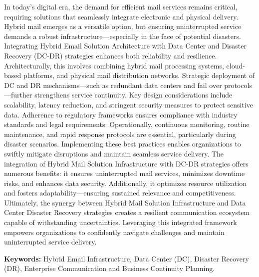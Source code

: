 In today's digital era, the demand for efficient mail services remains critical, requiring solutions that seamlessly integrate electronic and physical delivery. Hybrid mail emerges as a versatile option, but ensuring uninterrupted service demands a robust infrastructure—especially in the face of potential disasters. Integrating Hybrid Email Solution Architecture with Data Center and Disaster Recovery (DC-DR) strategies enhances both reliability and resilience. Architecturally, this involves combining hybrid mail processing systems, cloud-based platforms, and physical mail distribution networks. Strategic deployment of DC and DR mechanisms—such as redundant data centers and fail over protocols—further strengthens service continuity. Key design considerations include scalability, latency reduction, and stringent security measures to protect sensitive data. Adherence to regulatory frameworks ensures compliance with industry standards and legal requirements. Operationally, continuous monitoring, routine maintenance, and rapid response protocols are essential, particularly during disaster scenarios. Implementing these best practices enables organizations to swiftly mitigate disruptions and maintain seamless service delivery. The integration of Hybrid Mail Solution Infrastructure with DC-DR strategies offers numerous benefits: it ensures uninterrupted mail services, minimizes downtime risks, and enhances data security. Additionally, it optimizes resource utilization and fosters adaptability—ensuring sustained relevance and competitiveness. Ultimately, the synergy between Hybrid Mail Solution Infrastructure and Data Center Disaster Recovery strategies creates a resilient communication ecosystem capable of withstanding uncertainties. Leveraging this integrated framework empowers organizations to confidently navigate challenges and maintain uninterrupted service delivery.

\vspace{8pt}
\textbf{Keywords:} Hybrid Email Infrastructure, Data Center (DC), Disaster Recovery (DR), Enterprise Communication and Business Continuity Planning. 

